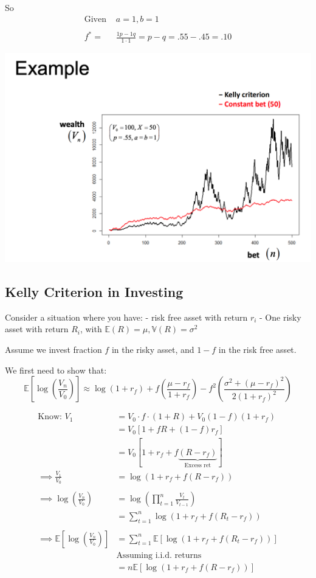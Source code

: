 \documentclass[
  oneside]{book}
\begin{document}
So
\[
\begin{aligned}
\text{Given }& a = 1, b = 1\\ \\
f^{*} = &\frac{1p-1q}{1\cdot1} = p-q = .55-.45 = .10
\end{aligned}
\]

\includegraphics{Notes/Obsidian-Attachments/8-Betting-Strategies-1.png}

\hypertarget{kelly-criterion-in-investing}{%
\subsection{Kelly Criterion in Investing}\label{kelly-criterion-in-investing}}

Consider a situation where you have:
- risk free asset with return \(r_{i}\)
- One risky asset with return \(R_{i}\), with \(\mathbb{E}(R) = \mu, \mathbb{V}(R) = \sigma^{2}\)

Assume we invest fraction \(f\) in the risky asset, and \(1-f\) in the risk free asset.

We first need to show that:
\[
\mathbb{E}\left[ \log\left( \frac{V_{n}}{V_{0}} \right) \right] \approx \log(1+r_{f}) +f\left( \frac{\mu-r_{f}}{1+r_{f}} \right)-f^{2}\left( \frac{\sigma^{2}+(\mu-r_{f})^{2}}{2(1+r_{f})^{2}} \right)
\]

\[
\begin{aligned}
\text{Know: }V_{1} &= V_{0}\cdot f\cdot(1+R) + V_{0}(1-f)(1+r_{f})\\
&= V_{0}[1+fR+(1-f)r_{f}]\\
&= V_{0}[1+r_{f}+f\underbrace{ (R-r_{f}) }_{ \text{Excess ret} }]\\
\implies \frac{V_{1}}{V_{0}} &= \log(1+r_{f}+f(R-r_{f}))\\
\\
\implies \log \left( \frac{V_{n}}{V_{0}} \right) &=  \log \left( \prod^{n}_{t=1} \frac{V_{t}}{V_{t-1}} \right) \\
&= \sum^{n}_{t=1} \log(1+r_{f}+f(R_{t}-r_{f}))\\
\\
\implies \mathbb{E}\left[ \log\left( \frac{V_{n}}{V_{0}} \right) \right] &= \sum^{n}_{t=1}\mathbb{E}[\log(1+r_{f}+f(R_{t}-r_{f}))]\\
& \text{Assuming i.i.d. returns}\\
&= n \mathbb{E}[\log(1+r_{f}+f(R-r_{f}))]
\end{aligned}
\]
\end{document}
